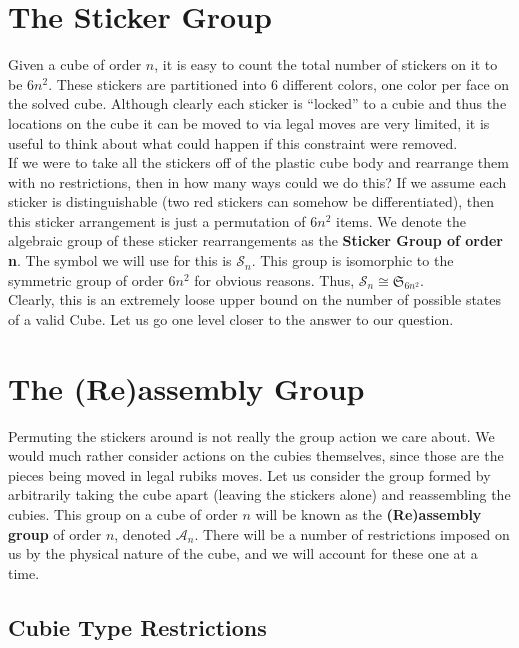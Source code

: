 \documentclass[10pt,letterpaper]{report}
\begin{document}
\section{The Sticker Group}
Given a cube of order $n$, it is easy to count the total number of stickers on it to be $6n^2$.  These stickers are partitioned into 6 different colors, one color per face on the solved cube.  Although clearly each sticker is ``locked'' to a cubie and thus the locations on the cube it can be moved to via legal moves are very limited, it is useful to think about what could happen if this constraint were removed. \\

If we were to take all the stickers off of the plastic cube body and rearrange them with no restrictions, then in how many ways could we do this?  If we assume each sticker is distinguishable (two red stickers can somehow be differentiated), then this sticker arrangement is just a permutation of $6n^2$ items.  We denote the algebraic group of these sticker rearrangements as the \textbf{Sticker Group of order n}.  The symbol we will use for this is $\mathcal{S}_n$.  This group is isomorphic to the symmetric group of order $6n^2$ for obvious reasons.  Thus, $\mathcal{S}_n \cong \mathfrak{S}_{6n^2}$. \\

Clearly, this is an extremely loose upper bound on the number of possible states of a valid Cube.  Let us go one level closer to the answer to our question.

\section{The (Re)assembly Group}
Permuting the stickers around is not really the group action we care about.  We would much rather consider actions on the cubies themselves, since those are the pieces being moved in legal rubiks moves.  Let us consider the group formed by arbitrarily taking the cube apart (leaving the stickers alone) and reassembling the cubies.  This group on a cube of order $n$ will be known as the \textbf{(Re)assembly group} of order $n$, denoted $\mathcal{A}_n$.  There will be a number of restrictions imposed on us by the physical nature of the cube, and we will account for these one at a time.

\subsection{Cubie Type Restrictions}
\end{document}
